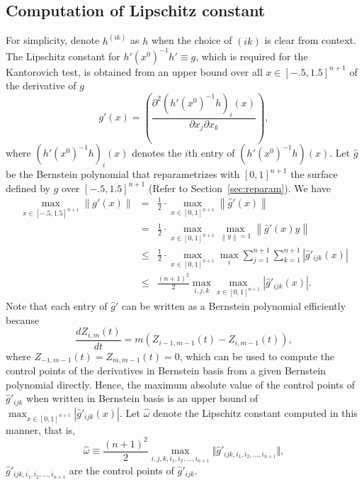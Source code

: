 \documentclass{article}
\newcommand{\norm}[1]{\left\|#1\right\|} \newcommand{\norma}[1]{\left\|#1\right\|}   \newcommand{\inv}[1]{#1^{-1}}
\begin{document}
\subsection{Computation of Lipschitz constant}
\label{section_implip}

For simplicity, denote $h^{(ik)}$ as $h$ when the choice of $(ik)$
is clear from context.  The Lipschitz constant for $h'(x^0)^{-1}h'
\equiv g$, which is required for the Kantorovich test, is obtained
from an upper bound over all $x \in [-.5, 1.5]^{n+1}$ of the derivative of $g$
\[
g'(x) =
\left(\frac{\partial^2\left(h'(x^0)^{-1}h\right)_i(x)}{\partial
x_j
\partial x_k} \right),
\]
where $\left(h'(x^0)^{-1}h\right)_i(x)$ denotes the $i$th entry of
$\left(h'(x^0)^{-1}h\right)(x)$. Let $\hat{g}$ be
the Bernstein polynomial that reparametrizes with $[0,1]^{n+1}$ the
surface defined by $g$ over $[-.5, 1.5]^{n+1}$ (Refer to Section~\ref{sec:reparam}).
We have
\begin{eqnarray}
\max_{x \in [-.5, 1.5]^{n+1}} \norm{g'(x)} & = & \frac{1}{2} \cdot \max_{x \in [0,1]^{n+1}} \norm{\hat{g}'(x)} \nonumber \\
& = & \frac{1}{2} \cdot \max_{x \in [0,1]^{n+1}} \max_{\norm{y}=1} \norm{\hat{g}'(x)y} 
\nonumber \\
                            & \leq &\frac{1}{2} \cdot \max_{x \in [0,1]^{n+1}}
 \max_i \sum_{j=1}^{n+1}\sum_{k=1}^{n+1} |\hat{g}'_{ijk}(x)| 
\nonumber \\
                            & \leq & \frac{(n+1)^2}{2} \max_{i,j,k} \max_{x \in [0,1]^{n+1}} | \hat{g}'_{ijk}(x) | .\nonumber
\end{eqnarray}
Note that each entry of $\hat{g}'$ can be written as a Bernstein
polynomial efficiently because
\begin{equation}
\frac{d Z_{i,m}(t)}{dt} = m\left(
Z_{i-1,m-1}(t)-Z_{i,m-1}(t)\right),
\label{eq:bezderiv1}
\end{equation}
where $Z_{-1,m-1}(t)=Z_{m,m-1}(t)=0$, which can be used to compute
the control points of the derivatives in Bernstein basis from a
given Bernstein polynomial directly. Hence, the maximum absolute
value of the control points of $\hat{g}'_{ijk}$ when written in
Bernstein basis is an upper bound of $\max_{x \in [0,1]^{n+1}} |
\hat{g}'_{ijk}(x)|$. Let $\hat{\omega}$ denote the Lipschitz
constant computed in this manner, that is,
\begin{equation}
\label{computedlip} \hat{\omega} \equiv \frac{(n+1)^2}{2} \max_{i,j,k,i_1,i_2,\ldots,i_{n+1}} 
\Vert\hat{g}'_{ijk,i_1,i_2,\ldots,i_{n+1}}\Vert
,
\end{equation}
$\hat{g}'_{ijk,i_1,i_2,\ldots,i_{n+1}}$ are the control points
of $\hat g'_{ijk}$.
\end{document}
